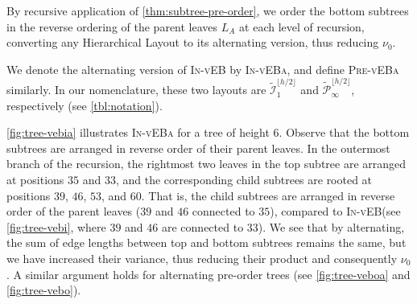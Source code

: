 \documentclass[10pt,conference,letterpaper]{IEEEtran}
\newcommand{\note}[1]{}
\newcommand{\comment}[1]{}
\newcommand{\HL}{Hierarchical Layout\xspace}
\newcommand{\pvl}{\textsc{Pre-vEB}\xspace}
\newcommand{\pvla}{\textsc{Pre-vEBa}\xspace}
\newcommand{\ivl}{\textsc{In-vEB}\xspace}
\newcommand{\ivla}{\textsc{In-vEBa}\xspace}
\newcommand{\WEP}{Weighted Edge Product\xspace}
\newcommand{\PR}{\ensuremath{\mathcal{P}}\xspace}
\newcommand{\IN}{\ensuremath{\mathcal{I}}\xspace}
\newcommand{\alt}[1]{\widetilde{#1}}
\newcommand{\FLOOR}[1]{\ensuremath{\lfloor #1 \rfloor}\xspace}
\newcommand{\pwmean}[1][p]{\ensuremath{\nu_{#1}}\xspace}
\begin{document}
By recursive application of \autoref{thm:subtree-pre-order}, we order the bottom subtrees in the reverse ordering of the parent leaves $L_A$ at each level of recursion, converting any \HL to its alternating version, thus reducing \pwmean[0].
\comment{
When we do this, the leaves of the tree appear to be alternating in order -- left-to-right at one level and right-to-left at the next -- explaining why we call such layouts alternating. Observe that this technique can be applied to any \HL, and the alternating version of any \HL reduces the \WEP. We denote the alternating version of any \HL by appending the letter \textsc{a}. In particular, we can define the alternating version of \ivl as the layout that arranges the bottom subtrees at each branch of the recursion in the reverse order of the parent leaves $L_A$ ---
}
We denote the alternating version of \ivl by \ivla, and define \pvla similarly. In our nomenclature, these two layouts are $\alt{\IN}^{\FLOOR{h/2}}_1$ and $\alt{\PR}^{\FLOOR{h/2}}_\infty$, respectively (see \autoref{tbl:notation}).

\autoref{fig:tree-vebia} illustrates \ivla for a tree of height $6$. 
Observe that the bottom subtrees are arranged in reverse order of their parent leaves.
In the outermost branch of the recursion, the rightmost two leaves in the top subtree are arranged at positions $35$ and $33$, and the corresponding child subtrees are rooted at positions $39$, $46$, $53$, and $60$. 
That is, the child subtrees are arranged in reverse order of the parent leaves ($39$ and $46$ connected to $35$), compared to 
\ivl (see \autoref{fig:tree-vebi}, where $39$ and $46$ are connected to $33$).
We see that by alternating, the sum of edge lengths between top and bottom subtrees remains the same, but we have increased their variance, thus reducing their product and consequently \pwmean[0].
A similar argument holds for alternating pre-order trees (see \autoref{fig:tree-veboa} and \autoref{fig:tree-vebo}).

\comment{
\autoref{fig:tree-veboa} illustrates \pvla for a tree of height $6$.
Observe that the bottom subtrees are arranged in reverse order of their parent leaves.
In the outermost branch of the recursion, the four leaves in the top subtree are arranged at positions $3$, $4$, $6$, and $7$, and the corresponding child subtrees are rooted at positions $8, 15, 22, \ldots, 57$. Compare this with \pvl (see \autoref{fig:tree-vebo}) where these child subtrees are arranged in the same order as the parent leaves.
As in the previous comparison, we notice that the \pwmean[1], which measures the weighted sum of edge lengths, has not changed. However, the \WEP has been reduced. 
\note{The number of unit-length edges *does* increase in \pvla. Added.}
}
\end{document}
